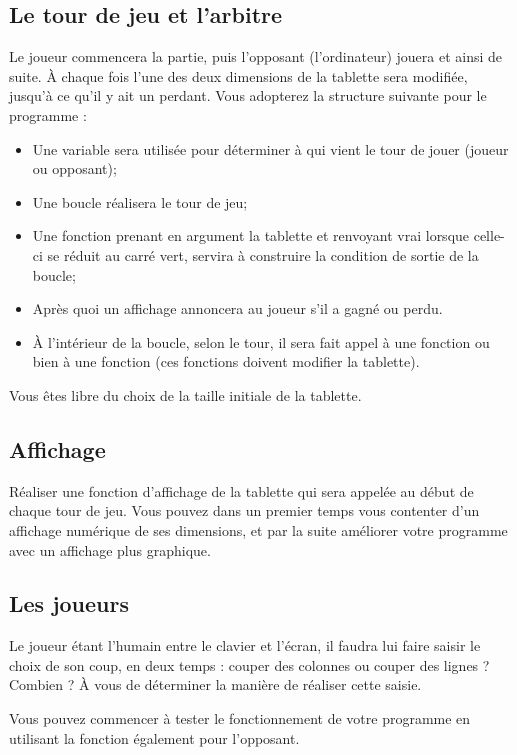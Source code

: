 \subsection{Le tour de jeu et l'arbitre}
Le joueur commencera la partie, puis l'opposant (l'ordinateur) jouera
et ainsi de suite. À chaque fois l'une des deux dimensions de la tablette sera
modifiée, jusqu'à ce qu'il y ait un perdant. Vous adopterez la
structure suivante pour le programme :
\begin{itemize}
\item Une variable sera utilisée pour déterminer à qui vient le tour de
  jouer (joueur ou opposant);
\item Une boucle réalisera le tour de jeu;
\item Une fonction  prenant en argument la tablette
  et renvoyant vrai lorsque celle-ci se réduit au carré vert, servira
  à construire la condition de sortie de la boucle;
\item Après quoi un affichage annoncera au joueur s'il a gagné ou
  perdu.
\item À l'intérieur de la boucle, selon le tour, il sera fait appel à
  une fonction  ou bien à une fonction  (ces
  fonctions doivent modifier la tablette).
\end{itemize}

Vous êtes libre du choix de la taille initiale de la tablette.

\subsection{Affichage}

Réaliser une fonction d'affichage de la tablette qui sera appelée au
début de chaque tour de jeu. Vous pouvez dans un premier temps vous
contenter d'un affichage numérique de ses dimensions, et par la suite
améliorer votre programme avec un affichage plus graphique.

\subsection{Les joueurs}

Le joueur étant l'humain entre le clavier et l'écran, il faudra lui
faire saisir le choix de son coup, en deux temps : couper des colonnes
ou couper des lignes ? Combien ? À vous de déterminer la manière de
réaliser cette saisie.

Vous pouvez commencer à tester le fonctionnement de votre programme en
utilisant la fonction  également pour l'opposant.

